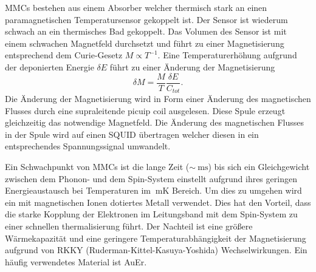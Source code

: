 MMCs bestehen aus einem Absorber welcher thermisch stark an einen paramagnetischen Temperatursensor gekoppelt ist.
Der Sensor ist wiederum schwach an ein thermisches Bad gekoppelt.
Das Volumen des Sensor ist mit einem schwachen Magnetfeld durchsetzt und führt zu einer Magnetisierung entsprechend dem Curie-Gesetz $M \propto T^{-1}$.
Eine Temperaturerhöhung aufgrund der deponierten Energie $\delta E$ führt zu einer Änderung der Magnetisierung
\begin{equation}
\delta M = \dfrac{M}{T}\frac{\delta E}{C_{tot}}.
\end{equation}
Die Änderung der Magnetisierung wird in Form einer Änderung des magnetischen Flusses durch eine supraleitende picuip coil ausgelesen.
Diese Spule erzeugt gleichzeitig das notwendige Magnetfeld.
Die Änderung des magnetischen Flusses in der Spule wird auf einen SQUID übertragen welcher diesen in ein entsprechendes Spannungssignal umwandelt.

Ein Schwachpunkt von MMCs ist die lange Zeit ($\sim\SI{}{\milli\second}$) bis sich ein Gleichgewicht zwischen dem Phonon- und dem Spin-System einstellt aufgrund ihres geringen Energieaustausch bei Temperaturen im $\SI{}{\milli\kelvin}$ Bereich.
Um dies zu umgehen wird ein mit magnetischen Ionen dotiertes Metall verwendet.
Dies hat den Vorteil, dass die starke Kopplung der Elektronen im Leitungsband mit dem Spin-System zu einer schnellen thermalisierung führt.
Der Nachteil ist eine größere Wärmekapazität und eine geringere Temperaturabhängigkeit der Magnetisierung aufgrund von RKKY (Ruderman-Kittel-Kasuya-Yoshida) Wechselwirkungen.
Ein häufig verwendetes Material ist AuEr.



